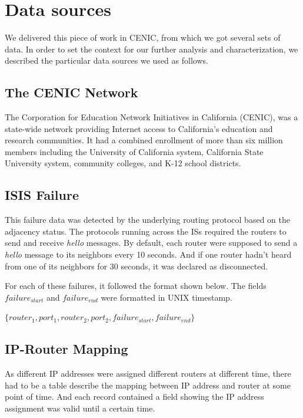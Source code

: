 \documentclass[conference, twocolumn, oneside, 10pt]{IEEEtran}
\begin{document}
\section{Data sources}
\label{sec:sec3}

We delivered this piece of work in CENIC, from which we got several sets of data. In order to set the context for our further analysis and characterization, we described the particular data sources we used as follows.

\subsection{The CENIC Network}

The Corporation for Education Network Initiatives in California (CENIC), was a state-wide network providing Internet access to California's education and research communities.\cite{cenic2013online} It had a combined enrollment of more than six million members including the University of California system, California State University system, community colleges, and K-12 school districts.

\subsection{ISIS Failure}

This failure data was detected by the underlying routing protocol based on the adjacency status. The protocols running across the ISs required the routers to send and receive \textit{hello} messages. By default, each router were supposed to send a \textit{hello} message to its neighbors every 10 seconds. And if one router hadn't heard from one of its neighbors for 30 seconds, it was declared as disconnected.

For each of these failures, it followed the format shown below. The fields $failure_{start}$ and $failure_{end}$ were formatted in UNIX timestamp.

$\{router_1, port_1, router_2, port_2, failure_{start}, failure_{end}\}$

\subsection{IP-Router Mapping}

As different IP addresses were assigned different routers at different time, there had to be a table describe the mapping between IP address and router at some point of time. And each record contained a field showing the IP address assignment was valid until a certain time.
\end{document}
